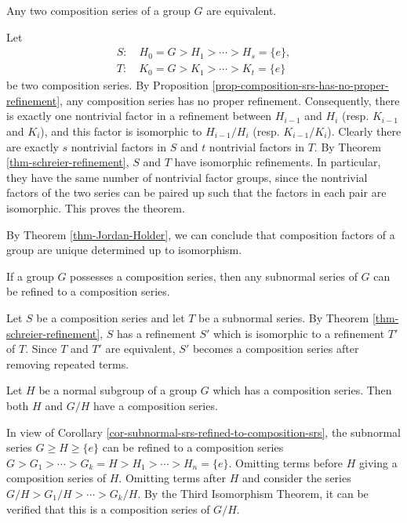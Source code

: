 \begin{theorem} \label{thm-Jordan-Holder}
	Any two composition series of a group $G$ are equivalent.
\end{theorem}
\begin{sketch}
		Let \begin{gather*}
		S: \quad H_0 = G > H_1 > \cdots > H_s = \{e\},
		\\
		T: \quad K_0 = G > K_1 > \cdots > K_t = \{e\}
	\end{gather*}
	be two composition series.	By Proposition \ref{prop-composition-srs-has-no-proper-refinement},  any composition series has no proper refinement. Consequently, there is exactly one nontrivial factor in a refinement between $H_{i-1}$ and $H_i$ (resp. $K_{i-1}$ and $K_i$), and this factor is isomorphic to $H_{i-1}/H_i$ (resp. $K_{i-1}/K_i$). Clearly there are exactly $s$ nontrivial factors in $S$ and $t$ nontrivial factors in $T$. By Theorem \ref{thm-schreier-refinement}, $S$ and $T$ have isomorphic refinements. In particular, they have the same number of nontrivial factor groups, since the nontrivial factors of the two series can be paired up  such that the factors in each pair are isomorphic. This proves the theorem.
\end{sketch}
By Theorem \ref{thm-Jordan-Holder}, we can conclude that composition factors of a group are unique determined up to isomorphism.

\begin{corollary} \label{cor-subnormal-srs-refined-to-composition-srs}
	If a group $G$ possesses a composition series, then any subnormal series of $G$ can be refined to a composition series.
\end{corollary}
\begin{sketch}
	Let $S$ be a composition series and let $T$ be a subnormal series. By Theorem \ref{thm-schreier-refinement}, $S$ has a refinement $S'$ which is isomorphic to a refinement $T'$ of $T$. Since $T$ and $T'$ are equivalent, $S'$ becomes a composition series after removing repeated terms.
\end{sketch}

\begin{corollary}
	Let $H$ be a normal subgroup of a group $G$ which has  a composition series. Then both $H$ and $G/H$ have a composition series.
\end{corollary}
\begin{sketch}
	In view of Corollary \ref{cor-subnormal-srs-refined-to-composition-srs}, the subnormal series $G\geq H\geq \{e\}$ can be refined to a composition series $G > G_1> \cdots > G_k =  H> H_1> \cdots > H_n = \{e\}$. Omitting terms before $H$ giving a composition series of $H$. Omitting terms after $H$ and consider the series $G/H> G_1/H> \cdots > G_k/H$. By the Third Isomorphism Theorem, it can be verified that this is a composition series of $G/H$.
\end{sketch}

